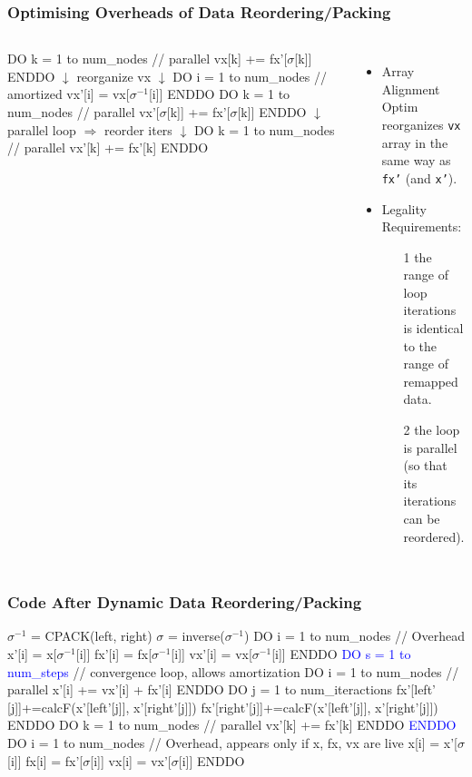 \documentclass{beamer}
\newcommand{\blue}[1]{\textcolor{Blue}{{#1}}}
\newcommand{\emp}[1]{\textcolor{DikuRed}{ #1}}
\newcommand{\emphh}[1]{\textcolor{CosGreen}{ #1}}
\newcommand{\mymath}[1]{$ #1 $}
\newcommand{\myindu}[1]{^{#1}}
\begin{document}
\begin{frame}[fragile,t]
  \frametitle{Optimising Overheads of Data Reordering/Packing}

\begin{columns}
\begin{colorcode}
DO k = 1 to num_nodes // parallel
  \emphh{vx[k]} += \alert{fx'[\mymath{\sigma}[k]]}
ENDDO
    \mymath{\downarrow} reorganize vx \mymath{\downarrow}
DO i = 1 to num_nodes // amortized
  vx'[i] = vx[\mymath{\sigma\myindu{-1}}[i]]
ENDDO
DO k = 1 to num_nodes // parallel
  \alert{vx'[\mymath{\sigma}[k]]} += \alert{fx'[\mymath{\sigma}[k]]}
ENDDO
    \mymath{\downarrow} parallel loop \mymath{\Rightarrow} reorder iters \mymath{\downarrow}
DO k = 1 to num_nodes // parallel
  \emphh{vx'[k]} += \emphh{fx'[k]}
ENDDO
\end{colorcode}
\begin{itemize}
    \item \emp{Array Alignment Optim} reorganizes {\tt vx}
            array in the same way as {\tt fx'} (and {\tt x'}).
    \item Legality Requirements:
        \begin{itemize}
            \item[1] the range of loop iterations is identical to
                        the range of remapped data.
            \item[2] the loop is parallel (so that its iterations can be reordered).
        \end{itemize}
\end  {itemize} 
\end{columns}

\end{frame}


\begin{frame}[fragile,t]
  \frametitle{Code After Dynamic Data Reordering/Packing}

\begin{colorcode}
\emp{\mymath{\sigma\myindu{-1}} = CPACK(left, right)}
\emp{\mymath{\sigma} = inverse(\mymath{\sigma\myindu{-1}})}
\emp{DO i = 1 to num_nodes // Overhead}
   x'[i] =  x[\mymath{\sigma\myindu{-1}}[i]]
  fx'[i] = fx[\mymath{\sigma\myindu{-1}}[i]]
  vx'[i] = vx[\mymath{\sigma\myindu{-1}}[i]]
\emp{ENDDO}
\blue{DO s = 1 to num_steps} // convergence loop, allows amortization
  DO i = 1 to num_nodes  // parallel
    \emphh{x'[i] += vx'[i] + fx'[i]}
  ENDDO
  DO j = 1 to num_iteractions
    \emphh{fx'[left' [j]]+=calcF(x'[left'[j]], x'[right'[j]])}
    \emphh{fx'[right'[j]]+=calcF(x'[left'[j]], x'[right'[j]])}
  ENDDO
  DO k = 1 to num_nodes // parallel
    \emphh{vx'[k] += fx'[k]}
  ENDDO
\blue{ENDDO}
\emp{DO i = 1 to num_nodes // Overhead}, appears only if x, fx, vx are live
   x[i] =  x'[\mymath{\sigma}[i]]
  fx[i] = fx'[\mymath{\sigma}[i]]
  vx[i] = vx'[\mymath{\sigma}[i]]
\emp{ENDDO}
\end{colorcode}
\end{frame}
\end{document}
